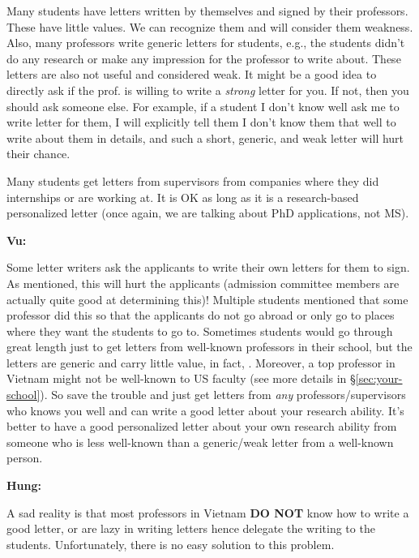 \documentclass[11pt]{article}
\newenvironment{commentbox}[1][]{
\small
    \begin{mybox}
    {\small \textbf{#1}}
 }{
   \end{mybox}
}
\newcommand{\red}[1]{{\color{red}{#1}}}
\begin{document}
Many students have letters written by themselves and signed by their professors. These have little
values. We can recognize them and will consider them weakness.
Also, many professors write generic letters for students, e.g., the students didn't do any
research or make any impression for the professor to write about. These letters are also not useful and considered weak.  It might be a good idea to directly ask if the prof. is willing to write a \emph{strong} letter for you. If not, then you should ask someone else.  For example, if a student I don't know well ask me to write letter for them, I will explicitly tell them I don't know them that well to write about them in details, and such a short, generic, and weak letter will hurt their chance.

Many students get letters from supervisors from companies where they did internships or are working at. It is OK as long as it is a research-based personalized letter (once again, we are talking about PhD applications, not MS).

\begin{commentbox}[Vu:]
Some letter writers ask the applicants to write their own letters for them to sign. As mentioned, this will hurt the applicants (admission committee members are actually quite good at determining this)! Multiple students mentioned that  some professor did this so that the applicants do not go abroad or only go to places where they want the students to go to.
\tcblower
Sometimes students would go through great length just to get letters from well-known professors in their school, but the letters are generic and carry little value, in fact, \red{red flags}. Moreover, a top professor in Vietnam might not be well-known to US faculty (see more details in \S\ref{sec:your-school}). So save the trouble and just get letters from \emph{any} professors/supervisors who knows you well and can write a good letter about your research ability. It's better to have a good personalized
letter about your own research ability from someone who is less
well-known than a generic/weak letter from a well-known person.
\end{commentbox}

\begin{commentbox}[Hung:]
A sad reality is that most professors in Vietnam \textbf{DO NOT} know how to write a good letter, or are lazy in writing letters hence delegate the writing to the students. Unfortunately, there is no easy solution to this problem.
\end{commentbox}
\end{document}
